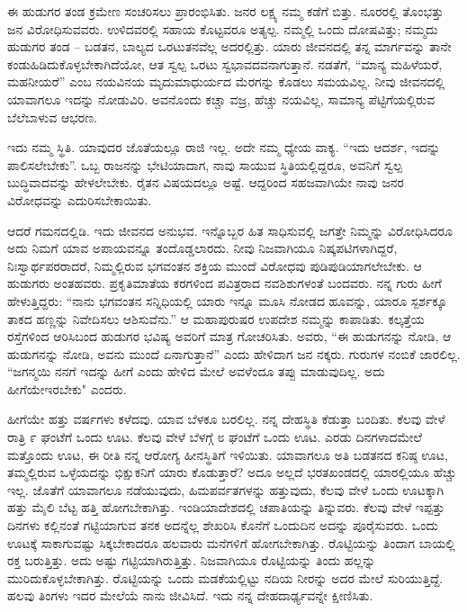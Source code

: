 \vskip  2pt

ಈ ಹುಡುಗರ ತಂಡ ಕ್ರಮೇಣ ಸಂಚರಿಸಲು ಪ್ರಾರಂಭಿಸಿತು. ಜನರ ಲಕ್ಷ್ಯ ನಮ್ಮ ಕಡೆಗೆ ಬಿತ್ತು. ನೂರರಲ್ಲಿ ತೊಂಭತ್ತು ಜನ ವಿರೋಧಿಸುವವರು. ಉಳಿದವರಲ್ಲಿ ಸಹಾಯ ಕೊಟ್ಟವರೂ ಅತ್ಯಲ್ಪ. ನಮ್ಮಲ್ಲಿ ಒಂದು ದೋಷವಿತ್ತು; ನಮ್ಮದು ಹುಡುಗರ ತಂಡ – ಬಡತನ, ಬಾಲ್ಯದ ಒರಟುತನವೆಲ್ಲ ಅದರಲ್ಲಿತ್ತು. ಯಾರು ಜೀವನದಲ್ಲಿ ತನ್ನ ಮಾರ್ಗವನ್ನು ತಾನೇ ಕಂಡುಹಿಡಿದುಕೊಳ್ಳಬೇಕಾಗಿದೆಯೋ, ಆತ ಸ್ವಲ್ಪ ಒರಟು ಸ್ವಭಾವದವನಾಗುತ್ತಾನೆ. ನಡತೆಗೆ, “ಮಾನ್ಯ ಮಹಿಳೆಯರೆ, ಮಹನೀಯರೆ” ಎಂಬ ನಯವಿನಯ ಮೃದುಮಾಧುರ್ಯದ ಮೆರಗನ್ನು ಕೊಡಲು ಸಮಯವಿಲ್ಲ. ನೀವು ಜೀವನದಲ್ಲಿ ಯಾವಾಗಲೂ ಇದನ್ನು ನೋಡುವಿರಿ. ಅವನೊಂದು ಕಚ್ಚಾ ವಜ್ರ, ಹೆಚ್ಚು ನಯವಿಲ್ಲ, ಸಾಮಾನ್ಯ ಪೆಟ್ಟಿಗೆಯಲ್ಲಿರುವ ಬೆಲೆಬಾಳುವ ಆಭರಣ.

\vskip  2pt

ಇದು ನಮ್ಮ ಸ್ಥಿತಿ. ಯಾವುದರ ಜೊತೆಯಲ್ಲೂ ರಾಜಿ ಇಲ್ಲ. ಅದೇ ನಮ್ಮ ಧ್ಯೇಯ ವಾಕ್ಯ. “ಇದು ಆದರ್ಶ, ಇದನ್ನು ಪಾಲಿಸಲೇಬೇಕು”. ಒಬ್ಬ ರಾಜನನ್ನು ಭೇಟಿಯಾದಾಗ, ನಾವು ಸಾಯುವ ಸ್ಥಿತಿಯಲ್ಲಿದ್ದರೂ, ಅವನಿಗೆ ಸ್ವಲ್ಪ ಬುದ್ಧಿವಾದವನ್ನು ಹೇಳಲೇಬೇಕು. ರೈತನ ವಿಷಯದಲ್ಲೂ ಅಷ್ಟೆ. ಆದ್ದರಿಂದ ಸಹಜವಾಗಿಯೇ ನಾವು ಜನರ ವಿರೋಧವನ್ನು ಎದುರಿಸಬೇಕಾಯಿತು.

ಆದರೆ ಗಮನದಲ್ಲಿಡಿ. ಇದು ಜೀವನದ ಅನುಭವ. ಇನ್ನೊಬ್ಬರ ಹಿತ ಸಾಧಿಸುವಲ್ಲಿ ಜಗತ್ತೇ ನಿಮ್ಮನ್ನು ವಿರೋಧಿಸಿದರೂ ಅದು ನಿಮಗೆ ಯಾವ ಅಪಾಯವನ್ನೂ ತಂದೊಡ್ಡಲಾರದು. ನೀವು ನಿಜವಾಗಿಯೂ ನಿಷ್ಕಪಟಿಗಳಾಗಿದ್ದರೆ, ನಿಃಸ್ವಾರ್ಥಪರರಾದರೆ, ನಿಮ್ಮಲ್ಲಿರುವ ಭಗವಂತನ ಶಕ್ತಿಯ ಮುಂದೆ ವಿರೋಧವು ಪುಡಿಪುಡಿಯಾಗಲೇಬೇಕು. ಆ ಹುಡುಗರು ಅಂತಹವರು. ಪ್ರಕೃತಿಮಾತೆಯ ಕರಗಳಿಂದ ಪವಿತ್ರರಾದ ನವಶಿಶುಗಳಂತೆ ಬಂದವರು. ನನ್ನ ಗುರು ಹೀಗೆ ಹೇಳುತ್ತಿದ್ದರು: “ನಾನು ಭಗವಂತನ ಸನ್ನಿಧಿಯಲ್ಲಿ ಯಾರು ಇನ್ನೂ ಮೂಸಿ ನೋಡದ ಹೂವನ್ನು, ಯಾರೂ ಸ್ಪರ್ಶಕ್ಕೂ ತಾಕದ ಹಣ್ಣನ್ನು ನಿವೇದಿಸಲು ಆಶಿಸುವೆನು.” ಆ ಮಹಾಪುರುಷರ ಉಪದೇಶ ನಮ್ಮನ್ನು ಕಾಪಾಡಿತು. ಕಲ್ಕತ್ತೆಯ ರಸ್ತೆಗಳಿಂದ ಆರಿಸಿಬಂದ ಹುಡುಗರ ಭವಿಷ್ಯ ಅವರಿಗೆ ಮಾತ್ರ ಗೋಚರಿಸಿತು. ಅವರು, “ಈ ಹುಡುಗನನ್ನು ನೋಡಿ, ಆ ಹುಡುಗನನ್ನು ನೋಡಿ, ಅವನು ಮುಂದೆ ಏನಾಗುತ್ತಾನೆ” ಎಂದು ಹೇಳಿದಾಗ ಜನ ನಕ್ಕರು. ಗುರುಗಳ ನಂಬಿಕೆ ಜಾರಲಿಲ್ಲ. “ಜಗನ್ಮಯಿ ನನಗೆ ಇದನ್ನು ಹೀಗೆ ಎಂದು ಹೇಳಿದ ಮೇಲೆ ಅವಳೆಂದೂ ತಪ್ಪು ಮಾಡುವುದಿಲ್ಲ. ಅದು ಹೀಗೆಯೇ\break ಇರಬೇಕು" ಎಂದರು.

ಹೀಗೆಯೇ ಹತ್ತು ವರ್ಷಗಳು ಕಳೆದವು. ಯಾವ ಬೆಳಕೂ ಬರಲಿಲ್ಲ. ನನ್ನ ದೇಹಸ್ಥಿತಿ ಕೆಡುತ್ತಾ ಬಂದಿತು. ಕೆಲವು ವೇಳೆ ರಾತ್ರಿ ೯ ಘಂಟೆಗೆ ಒಂದು ಊಟ. ಕೆಲವು ವೇಳೆ ಬೆಳಗ್ಗೆ ೮ ಘಂಟೆಗೆ ಒಂದು ಊಟ. ಎರಡು ದಿನಗಳಾದಮೇಲೆ ಮತ್ತೊಂದು ಊಟ, ಈ ರೀತಿ ನನ್ನ ಆರೋಗ್ಯ ಹೀನಸ್ಥಿತಿಗೆ ಇಳಿಯಿತು. ಯಾವಾಗಲೂ ಅತಿ ಬಡತನದ ಕನಿಷ್ಠ ಊಟ, ತಮ್ಮಲ್ಲಿರುವ ಒಳ್ಳೆಯದನ್ನು ಭಿಕ್ಷುಕನಿಗೆ ಯಾರು ಕೊಡುತ್ತಾರೆ? ಅದೂ ಅಲ್ಲದೆ ಭರತಖಂಡದಲ್ಲಿ ಯಾರಲ್ಲಿಯೂ ಹೆಚ್ಚು ಇಲ್ಲ. ಜೊತೆಗೆ ಯಾವಾಗಲೂ ನಡೆಯುವುದು, ಹಿಮಪರ್ವತಗಳನ್ನು ಹತ್ತುವುದು, ಕೆಲವು ವೇಳೆ ಒಂದು ಊಟಕ್ಕಾಗಿ ಹತ್ತು ಮೈಲಿ ಬೆಟ್ಟ ಹತ್ತಿ ಹೋಗಬೇಕಾಗಿತ್ತು. ಇಂಡಿಯಾದೇಶದಲ್ಲಿ ಚಪಾತಿಯನ್ನು ತಿನ್ನುವರು. ಕೆಲವು ವೇಳೆ ಇಪ್ಪತ್ತು ದಿನಗಳು ಕಲ್ಲಿನಂತೆ ಗಟ್ಟಿಯಾಗುವ ತನಕ ಅದನ್ನೆಲ್ಲ ಶೇಖರಿಸಿ ಕೊನೆಗೆ ಒಂದುದಿನ ಅದನ್ನು ಪೂರೈಸುವರು. ಒಂದು ಊಟಕ್ಕೆ ಸಾಕಾಗುವಷ್ಟು ಸಿಕ್ಕಬೇಕಾದರೂ ಹಲವಾರು ಮನೆಗಳಿಗೆ ಹೋಗಬೇಕಾಗಿತ್ತು. ರೊಟ್ಟಿಯನ್ನು ತಿಂದಾಗ ಬಾಯಲ್ಲಿ ರಕ್ತ ಬರುತ್ತಿತ್ತು. ಅದು ಅಷ್ಟು ಗಟ್ಟಿಯಾಗಿರುತ್ತಿತ್ತು. ನಿಜವಾಗಿಯೂ ರೊಟ್ಟಿಯನ್ನು ತಿಂದು ಹಲ್ಲನ್ನು ಮುರಿದುಕೊಳ್ಳಬೇಕಾಗಿತ್ತು. ರೊಟ್ಟಿಯನ್ನು ಒಂದು ಮಡಕೆಯಲ್ಲಿಟ್ಟು ನದಿಯ ನೀರನ್ನು ಅದರ ಮೇಲೆ ಸುರಿಯುತ್ತಿದ್ದೆ. ಹಲವು ತಿಂಗಳು ಇದರ ಮೇಲೆಯೆ ನಾನು ಜೀವಿಸಿದೆ. ಇದು ನನ್ನ ದೇಹದಾರ್ಢ್ಯವನ್ನೇ ಕ್ಷೀಣಿಸಿತು.

